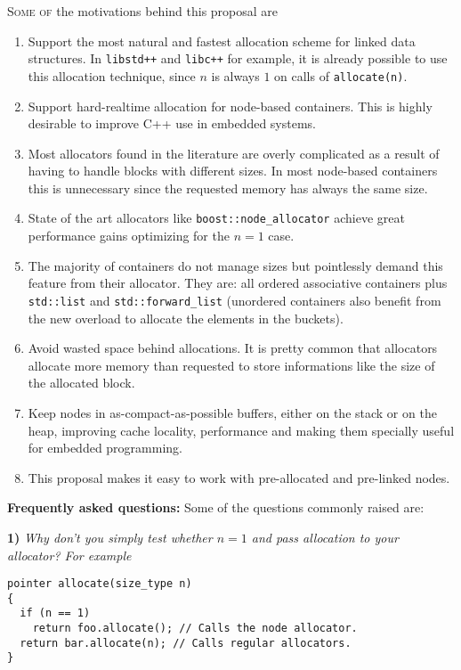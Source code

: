 \documentclass[11pt]{article}
\begin{document}
\textsc{Some of} the motivations behind this proposal are
\begin{enumerate}

\item Support the most natural and fastest allocation scheme for
linked data structures. In \texttt{libstd++} and \texttt{libc++}
for example, it is already possible to use this allocation
technique, since $n$ is always $1$ on calls of \texttt{allocate(n)}.

\item Support hard-realtime allocation for node-based containers.
This is highly desirable to improve C++ use in embedded systems.

\item Most allocators found in the literature are overly
complicated as a result of having to handle blocks with different
sizes. In most node-based containers this is unnecessary since the
requested memory has always the same size.

\item State of the art allocators like
\texttt{boost::node\_allocator} achieve great performance gains
optimizing for the $n = 1$ case. 

\item The majority of containers do not manage sizes but pointlessly
demand this feature from their allocator. They are: all ordered
associative containers plus \texttt{std::list} and
\texttt{std::forward\_list} (unordered containers also benefit from
the new overload to allocate the elements in the buckets).

\item Avoid wasted space behind allocations. It is pretty common that
allocators allocate more memory than requested to store informations
like the size of the allocated block.

\item Keep nodes in as-compact-as-possible buffers, either on the
stack or on the heap, improving cache locality, performance and making
them specially useful for embedded programming.

\item This proposal makes it easy to work with pre-allocated and
pre-linked nodes.
\end{enumerate}

\medskip
\noindent
{\bf Frequently asked questions:} Some of the questions commonly
raised are:

\medskip
\noindent
{\bf 1) }{\it Why don't you simply test whether $n = 1$ and pass
allocation to your allocator? For example}
\begin{lstlisting}
pointer allocate(size_type n)
{
  if (n == 1)
    return foo.allocate(); // Calls the node allocator.
  return bar.allocate(n); // Calls regular allocators.
}
\end{lstlisting}
\end{document}
